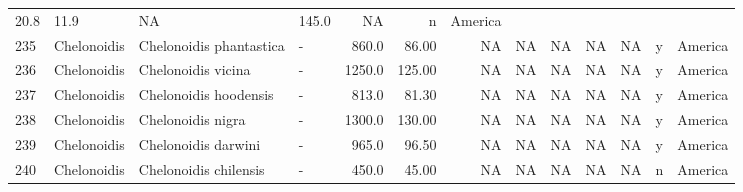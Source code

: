 \begin{landscape}
{\begin{longtable}[]{@{}llllrrrrrrlll@{}}
	20.8 & 11.9 & NA & 145.0 & NA & n & America\tabularnewline
	235 & Chelonoidis & Chelonoidis phantastica & - & 860.0 & 86.00 & NA &
	NA & NA & NA & NA & y & America\tabularnewline
	236 & Chelonoidis & Chelonoidis vicina & - & 1250.0 & 125.00 & NA & NA &
	NA & NA & NA & y & America\tabularnewline
	237 & Chelonoidis & Chelonoidis hoodensis & - & 813.0 & 81.30 & NA & NA
	& NA & NA & NA & y & America\tabularnewline
	238 & Chelonoidis & Chelonoidis nigra & - & 1300.0 & 130.00 & NA & NA &
	NA & NA & NA & y & America\tabularnewline
	239 & Chelonoidis & Chelonoidis darwini & - & 965.0 & 96.50 & NA & NA &
	NA & NA & NA & y & America\tabularnewline
	240 & Chelonoidis & Chelonoidis chilensis & - & 450.0 & 45.00 & NA & NA
	& NA & NA & NA & n & America\tabularnewline
	\bottomrule
\end{longtable}
}

	
\end{landscape}